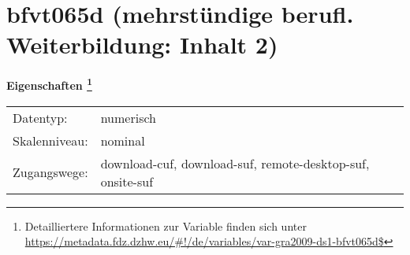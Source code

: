 
    \setcounter{footnote}{0}

    \vspace*{-1.8cm}
	\section{bfvt065d (mehrstündige berufl. Weiterbildung: Inhalt 2)}
	\label{section:bfvt065d}



    \vspace*{0.5cm}
    \noindent\textbf{Eigenschaften
	\footnote{Detailliertere Informationen zur Variable finden sich unter
		\url{https://metadata.fdz.dzhw.eu/\#!/de/variables/var-gra2009-ds1-bfvt065d$}}}\\
	\begin{tabularx}{\hsize}{@{}lX}
	Datentyp: & numerisch \\
	Skalenniveau: & nominal \\
	Zugangswege: &
	  download-cuf, 
	  download-suf, 
	  remote-desktop-suf, 
	  onsite-suf
 \\
    \end{tabularx}



